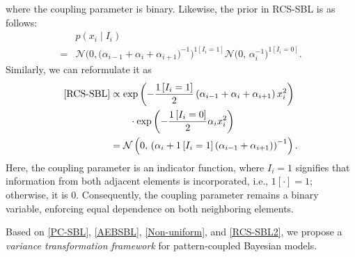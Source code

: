 \documentclass[lettersize,journal]{IEEEtran}
\theoremstyle{remark}
\begin{document}
 where the coupling parameter is binary. Likewise, the  prior in RCS-SBL is as follows:
 	\begin{equation}
 	\begin{aligned}
 		&p(x_i \mid I_i)\\
 		=& \mathcal{N}\Big(0,\big(\alpha_{i-1}+\alpha_i+\alpha_{i+1}\big)^{-1}\Big)^{1\left[I_i=1\right]}
 		\mathcal{N}\Big(0,\,\alpha_i^{-1}\Big)^{1\left[I_i=0\right]}.\label{RCS-SBL}
\end{aligned}
\end{equation}
Similarly, we can reformulate it as
	\begin{align}
		\eqref{RCS-SBL}
		&\propto \exp\left(-\frac{1\left[I_i=1\right]}{2} \left(\alpha_{i-1}+\alpha_i+\alpha_{i+1}\right)x_i^2\right)\notag\\
		&\qquad \cdot \exp\left(-\frac{1\left[I_i=0\right]}{2} \alpha_i x_i^2\right)\notag\\
		&=\mathcal{N}\left( 0,\,\left(\alpha_i+1\left[I_i=1\right] (\alpha_{i-1}+\alpha_{i+1})\right)^{-1}\right).\label{RCS-SBL2}
	\end{align}
Here, the coupling parameter is an indicator function, where \( I_i = 1 \) signifies that information from both adjacent elements is incorporated, i.e., \( 1[\cdot] = 1 \); otherwise, it is 0. Consequently, the coupling parameter remains a binary variable, enforcing equal dependence on both neighboring elements.

Based on \eqref{PC-SBL}, \eqref{AEBSBL}, \eqref{Non-uniform}, and \eqref{RCS-SBL2}, we propose a \emph{variance transformation framework} for pattern-coupled Bayesian models.
\end{document}

